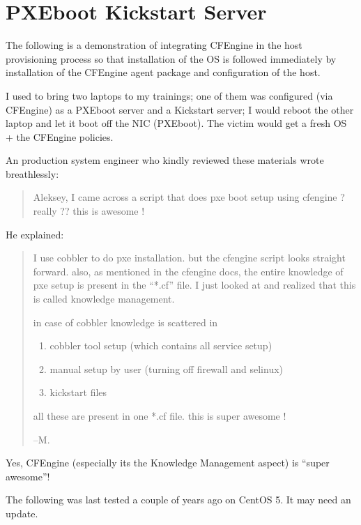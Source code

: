 \section{PXEboot Kickstart Server}

The following is a demonstration of integrating CFEngine in the host provisioning process so that installation of the OS is followed immediately by installation of the CFEngine agent package and configuration of the host.

I used to bring two laptops to my trainings; one of them was configured (via CFEngine) as a PXEboot server and a Kickstart server; I would reboot the other laptop and let it boot off the NIC (PXEboot).  The victim would get a fresh OS + the CFEngine policies.

An production system engineer who kindly reviewed these materials wrote breathlessly:

\begin{quote}
Aleksey, I came across a script that does pxe boot setup using cfengine ?
really ??
this is awesome !
\end{quote}

He explained:

\begin{quotation}
I use cobbler to do pxe installation. but the cfengine script looks straight forward. also, as mentioned in the cfengine docs, the entire knowledge of pxe setup is present in the ``*.cf'' file. I just looked at and realized that this is called knowledge management.

in case of cobbler knowledge is scattered in

\begin{enumerate}
\item{} cobbler tool setup (which contains all service setup)
\item{} manual setup by user (turning off firewall and selinux)
\item{} kickstart files
\end{enumerate}

all these are present in one *.cf file. this is super awesome !

--M.
\end{quotation}

Yes, CFEngine (especially its the Knowledge Management aspect) is ``super awesome''!

The following was last tested a couple of years ago on CentOS 5.  It may need an update.

